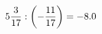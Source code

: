 \documentclass[preview]{standalone}
\begin{document}
\begin{align*}
5 { 3 \over 17 }  :  \left( - { 11 \over 17 } \right) = -8.0
\end{align*}
\end{document}
